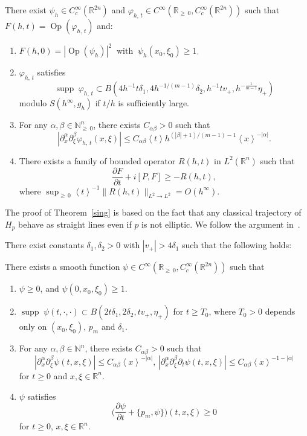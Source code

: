 \documentclass[AHL,Unicode,longabstracts,published]{cedram}
\renewcommand*\a{\alpha}
\renewcommand*\b{\beta}
\renewcommand*\d{\delta}
\newcommand*\f{\varphi}
\newcommand*\g{\psi}
\newcommand*\x{\xi}
\newcommand*\y{\eta}
\DeclareMathOperator{\Op}{Op}
\newcommand*\re{\mathbb{R}}
\newcommand{\bbN}{\mathbb{N}}
\newcommand*\pa{\partial}
\DeclareMathOperator{\supp}{supp\;}
\newcommand{\jap}[1]{\left\langle #1 \right\rangle}
\newcommand{\biggpare}[1]{\biggl(#1\biggr)}
\newcommand*{\romanenumi}{\renewcommand*{\theenumi}{\roman{enumi}}}
\begin{document}
\begin{theo}\label{sing}
There exist $\g_{h}\in C_c^\infty(\re^{2n})$ and $\f_{h,\,t} \in C^{\infty}(\re_{\geq\,0},C_c^{\infty}(\re^{2n}))$ such that $F(h,t) = \Op(\f_{h,\,t})$ and:
\begin{enumerate}\romanenumi
\item\label{theoB1.1} $F(h,0) =|\Op(\g_{h})|^2\;\; \text{with}\;\; \g_{h}(x_0,\x_0) \geq 1$.
\item\label{theoB1.2} $\f_{h,\,t}$ satisfies
\[
\supp \f_{h,\,t}\subset B\left(4h^{-1}t\d_1,4h^{-1/(m-1)}\d_2,h^{-1}tv_+,h^{-\frac{1}{m-1}}\y_+\right)
\]
modulo $S(h^{\infty},g_h)$ if $t/h$ is sufficiently large.
\item\label{theoB1.3} For any $\a,\b\in \bbN_{\geq\,0}^n$, there exists $C_{\a\b}>0$ such that
\[
\left|\pa_x^{\a}\pa_{\x}^{\b}\f_{h,\,t}(x,\x)\right|\leq C_{\a\b}\jap{t} h^{(|\b|+1)/(m-1)-1} \jap{x}^{-|\a|}.
\]
\item\label{theoB1.4} There exists a family of bounded operator $R(h,t)$ in $L^2(\re^n)$ such that
\[
\frac{\pa F}{\pa t} + i[P, F] \geq -R(h,t),
\]
where $\sup_{\geq\,0} \jap{t}^{-1}\|R(h,t)\|_{L^2\rightarrow L^2} = O(h^{\infty})$.
\end{enumerate}
\end{theo}


The proof of Theorem~\ref{sing} is based on the fact that any classical trajectory of $H_p$ behave as straight lines even if $p$ is not elliptic. We follow the argument in~\cite{N}.


\begin{lemm}\label{sym}
There exist constants $\d_1, \d_2 >0$ with $|v_+|>4\d_1$ such that the following holds:

There exists a smooth function $\g \in C^{\infty}(\re_{\geq\,0}, C_c^{\infty}(\re^{2n}))$ such that
\begin{enumerate}\romanenumi
\item \label{lemmB2.1}$\g \geq 0$, and $\g(0, x_0, \x_0) \geq 1$.
\item \label{lemmB2.2}$\supp \g(t, \cdot, \cdot) \subset B(2t\d_1,2\d_2,tv_+,\y_+)$ for $t\geq T_0$, where $T_0>0$ depends only on $(x_0,\x_0)$, $p_m$ and $\d_1$.
\item \label{lemmB2.3}For any $\a,\b \in \bbN^n$, there exists $C_{\a\b}>0$ such that
\[
\left|\pa_x^{\a}\pa_{\x}^{\b}\g(t,x,\x)\right|\leq C_{\a\b}\jap{x}^{-|\a|},\,\left|\pa_x^{\a}\pa_{\x}^{\b}\pa_t\g(t,x,\x)\right|\leq C_{\a\b}\jap{x}^{-1-|\a|}
\]
for $t\geq 0$ and $x,\x \in \re^n$.
\item \label{lemmB2.4}$\g$ satisfies
\[
\biggpare{\frac{\pa \g}{\pa t} + \{p_m, \g \}}(t, x,\x) \geq 0
\]
for $t\geq 0$, $x,\x \in \re^n$.
\end{enumerate}
\end{lemm}
\end{document}
